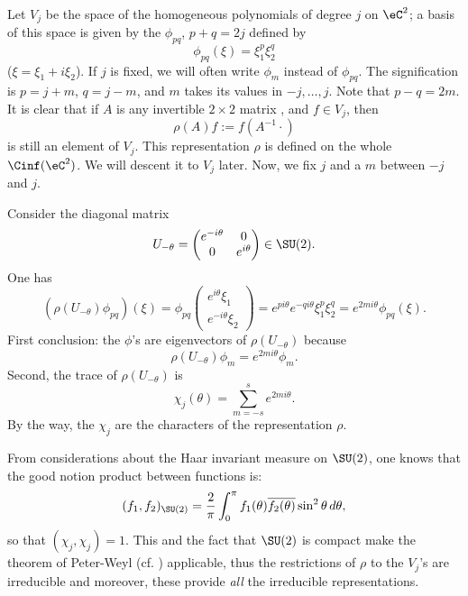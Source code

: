 Let $V_j$ be the space of the homogeneous polynomials of degree $j$ on $\eC^2$; a basis of this space is given by the $\phi_{pq}$, $p+q=2j$ defined by
\begin{equation}
   \phi_{pq}(\xi)=\xi_1^p\xi_2^q
\end{equation}
($\xi=\xi_1+i\xi_2$). If $j$ is fixed, we will often write $\phi_m$ instead of $\phi_{pq}$. The signification is $p=j+m$, $q=j-m$, and $m$ takes its values in $-j,\ldots,j$. Note that $p-q=2m$. It is clear that if $A$ is any invertible $2\times 2$ matrix , and $f\in V_j$, then
\[
   \rho(A)f:=f(A^{-1} \cdot)
\]
 is still an element of $V_j$. This representation $\rho$ is defined on the whole $\Cinf(\eC^2)$. We will descent it to $V_j$ later.
Now, we fix $j$ and a $m$ between $-j$ and $j$.

Consider the diagonal matrix
\[   U_{-\theta}=\begin{pmatrix}
e^{-i\theta} & 0 \\
0 & e^{i\theta}
\end{pmatrix} \in\SU(2).
\]
One has
\begin{equation}
  \left(\rho(U_{-\theta})\phi_{pq}\right)(\xi)=\phi_{pq}
\begin{pmatrix}
   e^{i\theta}\xi_1 \\
    e^{-i\theta}\xi_2
\end{pmatrix}
                                               = e^{pi\theta} e^{-qi\theta}\xi_1^p\xi_2^q
					       =e^{2mi\theta}\phi_{pq}(\xi).
\end{equation}
First conclusion: the $\phi$'s are eigenvectors of $\rho(U_{-\theta})$ because
\[
   \rho(U_{-\theta})\phi_m=e^{2mi\theta}\phi_m.
\]
Second, the trace of $\rho(U_{-\theta})$ is
\begin{equation}
   \chi_j(\theta)=\sum_{m=-s}^{s}e^{2mi\theta}.
\end{equation}
By the way, the $\chi_j$ are the characters of the representation $\rho$.

From considerations about the Haar\quextproj{} invariant measure on $\SU(2)$, one knows that the good notion product between functions is:
\begin{equation}
(f_1,f_2)_{\SU(2)}=\frac{2}{\pi}\int_0^{\pi}f_1(\theta)\overline{ f_2(\theta) }\sin^2\theta\,d\theta,
\end{equation}
so that $(\chi_j,\chi_j)=1$. This and the fact that $\SU(2)$ is compact make the theorem of Peter-Weyl (cf. \cite{Sternberg}) applicable, thus the restrictions of $\rho$ to the $V_j$'s are irreducible and moreover, these provide \emph{all} the irreducible representations.

